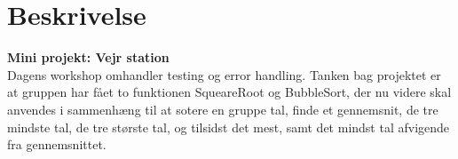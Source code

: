 \documentclass[11pt]{article}
\renewcommand{\baselinestretch}{1.20}
\begin{document}
    
    
    
    \renewcommand{\baselinestretch}{0.8}
    \tableofcontents
    \renewcommand{\baselinestretch}{1.20}
    \newpage
    
    \section{Beskrivelse}
    \textbf{Mini projekt: Vejr station}\\
    \noindent
    Dagens workshop omhandler testing og error handling.
    Tanken bag projektet er at gruppen har fået to funktionen SqueareRoot og BubbleSort, der nu videre skal anvendes i sammenhæng til at sotere en gruppe tal, finde et gennemsnit, de tre mindste tal, de tre største tal, og tilsidst det mest, samt det mindst tal afvigende fra gennemsnittet.\\
\end{document}
